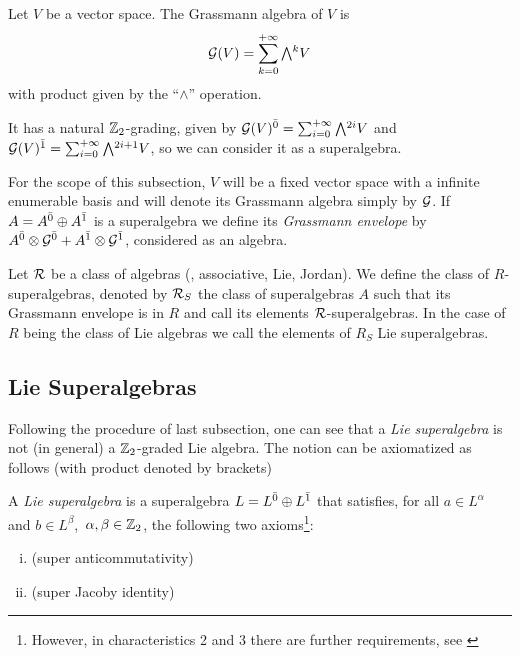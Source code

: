 \begin{defi}\label{def:Grassmann-algebra}
	Let $V$ be a vector space. The Grassmann algebra of $V$ is
	\[\mc G(V) = \sum_{k=0}^{+\infty} \Exterior^k V\]
	with product given by the ``$\wedge$'' operation.

	It has a natural $\mathbb{Z}_{2}$-grading, given by $\mc G(V)\even = \sum_{i=0}^{+\infty}\Exterior^{2i} V$ and $\mc G(V)\odd = \sum_{i=0}^{+\infty}\Exterior^{2i+1} V$, so we can consider it as a superalgebra.
\end{defi}

For the scope of this subsection, $V$ will be a fixed vector space with a infinite enumerable basis and will denote its Grassmann algebra simply by $\mathcal G$. If $A=A^{\bar0}\oplus A^{\bar1}$ is a superalgebra we define its \emph{Grassmann envelope} by $A^{\bar0}\otimes \mathcal G^{\bar0} + A^{\bar1}\otimes \mathcal G^{\bar1}$, considered as an algebra.

Let $\mathcal R$ be a class of algebras (\eg, associative, Lie, Jordan). We define the class of $R$-superalgebras, denoted by $\mathcal R_S$ the class of superalgebras $A$ such that its Grassmann envelope is in $R$ and call its elements $\mathcal R$-superalgebras. In the case of $R$ being the class of Lie algebras we call the elements of $R_S$ Lie superalgebras.


\subsection{Lie Superalgebras}
Following the procedure of last subsection, one can see that a \emph{Lie superalgebra} is not (in general) a $\mathbb{Z}_{2}$-graded Lie algebra. The notion can be axiomatized as follows (with product denoted by brackets)

\begin{defi}
	A \emph{Lie superalgebra} is a superalgebra $L=L^{\bar0}\oplus L^{\bar1}$ that satisfies, for all $a \in L^{\alpha}$ and $b \in L^{\beta}$, $\,\alpha,\beta\in\mathbb{Z}_{2}$, the following two axioms\footnote{However, in characteristics  2 and 3 there are further requirements, see \cite[Subsection 1.2]{MR1192546} }:

	\begin{enumerate}[(i)]
		\item {}(super anticommutativity)
		\item {}(super Jacoby identity)
	\end{enumerate}
\end{defi}

